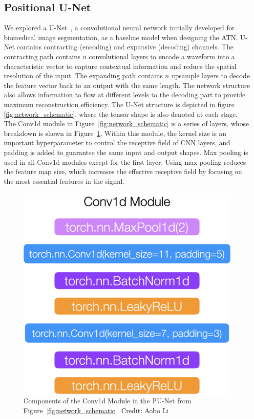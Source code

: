 

\subsection{Positional U-Net}
We explored a U-Net~\cite{UNet}, a convolutional neural network initially developed for biomedical image segmentation, as a baseline model when designing the ATN. U-Net contains contracting (encoding) and expansive (decoding) channels. The contracting path contains $n$ convolutional layers to encode a waveform into a characteristic vector to capture contextual information and reduce the spatial resolution of the input. The expanding path contains $n$ upsample layers to decode the feature vector back to an output with the same length. The network structure also allows information to flow at different levels to the decoding part to provide maximum reconstruction efficiency. The U-Net structure is depicted in figure \ref{fig:network_schematic}, where the tensor shape is also denoted at each stage. The Conv1d module in Figure~\ref{fig:network_schematic} is a series of layers, whose breakdown is shown in Figure~\ref{ch6:fig:cov1d_break_down}. Within this module, the kernel size is an important hyperparameter to control the receptive field of CNN layers, and padding is added to guarantee the same input and output shapes. Max pooling is used in all Conv1d modules except for the first layer. Using max pooling reduces the feature map size, which increases the effective receptive field by focusing on the most essential features in the signal.

\begin{figure}[htb!]
    \centering
    \includegraphics[width=0.4\linewidth,trim={0pc 0pc 0pc 0pc},clip]{ch6/figs/conv1d.png}
    \caption{Components of the Conv1d Module in the PU-Net from Figure~\ref{fig:network_schematic}.  Credit: Aobo Li}
    \label{ch6:fig:cov1d_break_down}
\end{figure}

